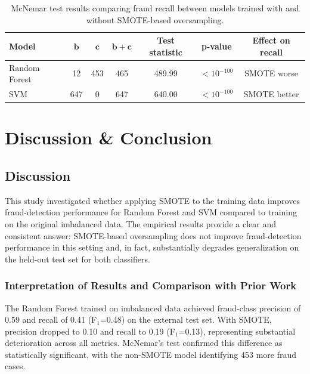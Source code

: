 \documentclass[oneside,12pt,parskip=half,american,numbers=noenddot]{scrreprt}
\begin{document}
\begin{table}[H]
\centering
\caption{McNemar test results comparing fraud recall between models trained with and without SMOTE-based oversampling.}
\label{tab:mcnemar_summary}
\small
\renewcommand{\arraystretch}{1.2}
\begin{tabular}{lcccccc}
\hline
\textbf{Model} & 
$\boldsymbol{b}$ &
$\boldsymbol{c}$ &
$\boldsymbol{b+c}$ &
\textbf{Test statistic} &
\textbf{p-value} &
\textbf{Effect on recall} \\
\hline
Random Forest & 12 & 453 & 465 & 489.99 & $<10^{-100}$ & SMOTE worse \\
SVM           & 647 & 0   & 647 & 640.00 & $<10^{-100}$ & SMOTE better \\
\hline
\end{tabular}
\end{table}




\pagebreak
\chapter{Discussion \& Conclusion}

\section{Discussion}

This study investigated whether applying SMOTE to the training data improves fraud-detection performance for Random Forest and SVM compared to training on the original imbalanced data. The empirical results provide a clear and consistent answer: SMOTE-based oversampling does not improve fraud-detection performance in this setting and, in fact, substantially degrades generalization on the held-out test set for both classifiers.

\subsection{Interpretation of Results and Comparison with Prior Work}

The Random Forest trained on imbalanced data achieved fraud-class precision of 0.59 and recall of 0.41 (F$_1$=0.48) on the external test set. With SMOTE, precision dropped to 0.10 and recall to 0.19 (F$_1$=0.13), representing substantial deterioration across all metrics. McNemar's test confirmed this difference as statistically significant, with the non-SMOTE model identifying 453 more fraud cases.
\end{document}
